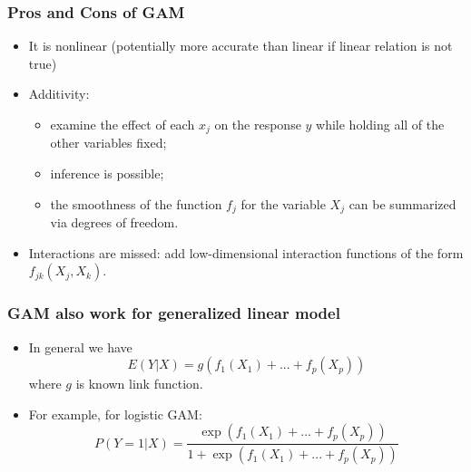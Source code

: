 \documentclass{beamer}
\begin{document}
 
 \begin{frame}
 	\frametitle{Pros and Cons of GAM}
 	\begin{itemize}
 		
 		\item  It is nonlinear (potentially more accurate than linear if linear relation is not true)
 		\item  Additivity:
		\begin{itemize}
		\item examine the effect of each $x_j$ on the response $y$ while holding all of the other variables
 		fixed; 
		\item inference is possible; 
		\item the smoothness of the function $f_j$ for the variable $X_j$ can be summarized via degrees of freedom. 
		\end{itemize} 
 		\item  Interactions are missed: add low-dimensional interaction functions of the form $f_{jk}(X_j,X_k)$. 
 	\end{itemize}
 \end{frame}        
 
 
 
 \begin{frame}
 	\frametitle{ GAM also work for generalized linear model}
 	\begin{itemize}
 		
 		\item In general we have 
 	$$E(Y|X) = g(f_1(X_1) + ...+ f_p(X_p))$$
 		where $g$ is known link function. 
 		\item   For example, for logistic GAM:
 		$$P(Y=1|X) = \frac{\exp(f_1(X_1) +...+f_p(X_p))}{1 + \exp(f_1(X_1) +...+f_p(X_p))}$$
 	\end{itemize}
 \end{frame}    
 
 
 
 
              
\end{document}
